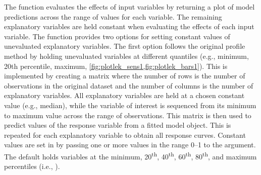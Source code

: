 \documentclass[article,shortnames]{jss}
\begin{document}
The  function evaluates the effects of input variables by returning a plot of model predictions across the range of values for each variable.  The remaining explanatory variables are held constant when evaluating the effects of each input variable.  The  function provides two options for setting constant values of unevaluated explanatory variables.  The first option follows the original profile method by holding unevaluated variables at different quantiles (e.g., minimum, 20th percentile, maximum, \cref{fig:plotlek_sens1,fig:plotlek_bars1}). This is implemented by creating a matrix where the number of rows is the number of observations in the original dataset and the number of columns is the number of explanatory variables. All explanatory variables are held at a chosen constant value (e.g., median), while the variable of interest is sequenced from its minimum to maximum value across the range of observations. This matrix is then used to predict values of the response variable from a fitted model object. This is repeated for each explanatory variable to obtain all response curves.  Constant values are set in  by passing one or more values in the range 0--1 to the  argument.  The default holds variables at the minimum, 20\textsuperscript{th}, 40\textsuperscript{th}, 60\textsuperscript{th}, 80\textsuperscript{th}, and maximum percentiles (i.e., ).  
\end{document}
